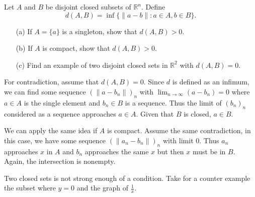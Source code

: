 \documentclass[../main.tex]{subfiles}
\begin{document}
\begin{problem}[\S4.4 I]
Let $A$ and $B$ be disjoint closed subsets of $\mathbb{R}^n$.
Define
\[
	d(A, B) = \inf\{\|a - b\| : a \in A, b \in B\}.
\]
\begin{itemize}
	\item[(a)] If $A = \{a\}$ is a singleton, show that $d(A, B) > 0$.
	\item[(b)] If $A$ is compact, show that $d(A, B) > 0$.
	\item[(c)] Find an example of two disjoint closed sets in $\mathbb{R}^2$ with $d(A, B) = 0$.
\end{itemize}
\end{problem}

For contradiction, assume that $d(A, B) = 0$.
Since $d$ is defined as an infimum, we can find some sequence $(\|a - b_n\|)_n$ with $\lim_{n \to \infty} (a - b_n) = 0$ where $a \in A$ is the single element and $b_n \in B$ is a sequence.
Thus the limit of $(b_n)_n$ considered as a sequence approaches $a \in A$.
Given that $B$ is closed, $a \in B$.

We can apply the same idea if $A$ is compact.
Assume the same contradiction, in this case, we have some sequence $(\|a_n - b_n\|)_n$ with limit $0$.
Thus $a_n$ approaches $x$ in $A$ and $b_n$ approaches the same $x$ but then $x$ must be in $B$.
Again, the intersection is nonempty.

Two closed sets is not strong enough of a condition.
Take for a counter example the subset where $y = 0$ and the graph of $\frac{1}{x}$.
\end{document}
